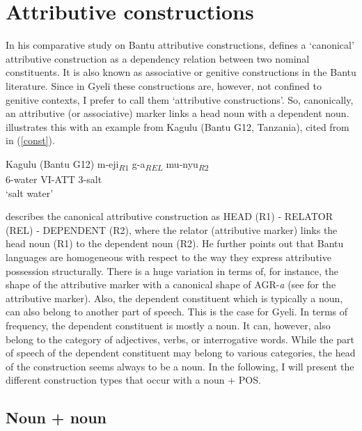 \section{Attributive constructions}
\label{sec:CONC}

In his comparative study on Bantu attributive constructions, \citet{velde2013} defines a `canonical' attributive construction as a dependency relation between two nominal constituents. It is also known as associative or genitive constructions in the Bantu literature. Since in Gyeli these constructions are, however, not confined to genitive contexts, I prefer to call them `attributive constructions'.  So, canonically, an attributive (or associative) marker links a head noun with a dependent noun. \citet[217]{velde2013} illustrates this with an example from Kagulu (Bantu G12, Tanzania), cited from \citet[86]{petzell2008} in (\ref{const}).

\begin{exe}
\ex\label{const} Kagulu (Bantu G12) 
  \gll  m-eji\textsubscript{$R1$} g-a\textsubscript{$REL$} mu-nyu\textsubscript{$R2$}\\
              6-water VI-ATT 3-salt\\
    \trans `salt water'
\end{exe}

\noindent \citet{velde2013} describes the canonical attributive construction as HEAD (R1) - RELATOR (REL) - DEPENDENT (R2), where the relator (attributive marker) links the head noun (R1) to the dependent noun (R2).  He further points out that Bantu languages are homogeneous with respect to the way they express attributive possession structurally. There is a huge variation in terms of, for instance, the shape of the attributive marker with a canonical shape of AGR-{\itshape a} (see  for the attributive marker). Also, the dependent constituent which is typically a  noun, can also belong to another part of speech. This is the case for Gyeli. In terms of frequency, the dependent constituent is mostly a noun. It can, however, also belong to the category of adjectives, verbs, or interrogative words. While the part of speech of the dependent constituent may belong to various categories, the head of the construction seems always to be a noun. In the following, I will present the different construction types that occur with a noun + POS. 

\subsection{Noun + noun}
\label{sec:NN}

